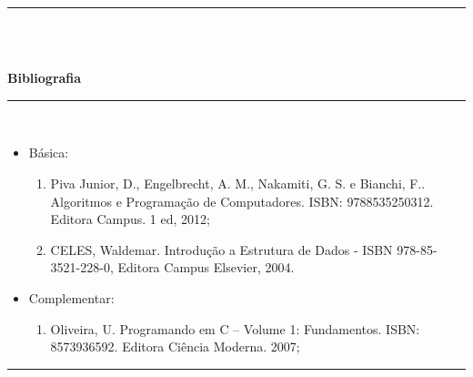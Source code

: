 \noindent\rule{16.5cm}{0.4pt}\\
\\
\vspace{-12mm}
\begin{center}\textbf{Bibliografia}\end{center}
\vspace{-5mm}
\noindent\rule{16.5cm}{0.4pt}
\\
\begin{itemize} 
  \item Básica:
	\begin{enumerate}
	\item Piva Junior, D., Engelbrecht,  A. M., Nakamiti,  G. S. e Bianchi, F.. Algoritmos e Programação de Computadores. ISBN: 9788535250312. Editora Campus. 1 ed, 2012;
	\item CELES, Waldemar. Introdução a Estrutura de Dados -  ISBN 978-85-3521-228-0, Editora Campus Elsevier, 2004.
	\end{enumerate}
  \item Complementar:
	\begin{enumerate} 
	\item Oliveira, U. Programando em C – Volume 1: Fundamentos. ISBN: 8573936592. Editora Ciência Moderna. 2007;
	\end{enumerate}
\end{itemize}
\noindent\rule{16.5cm}{0.4pt}\\
\\
